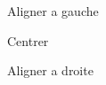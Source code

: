 \documentclass{article}
\begin{document}
	
	\begin{flushleft}
		Aligner a gauche
	\end{flushleft}
	
	\begin{center}
		Centrer
	\end{center} 
	
	\begin{flushright}
		Aligner a droite
	\end{flushright}
\end{document}
